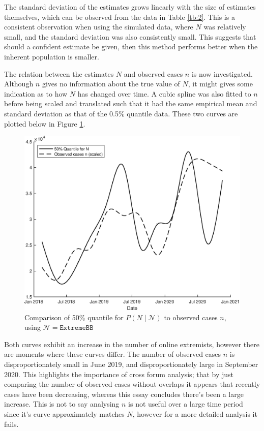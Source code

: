\documentclass[10pt,a4paper,notitlepage]{article}
\begin{document}
The standard deviation of the estimates grows linearly with the size of estimates themselves, which can be observed from the data in Table \ref{tb:2}. This is a consistent observation when using the simulated data, where $N$ was relatively small, and the standard deviation was also consistently small. This suggests that should a confident estimate be given, then this method performs better when the inherent population is smaller.

The relation between the estimates $N$ and observed cases $n$ is now investigated. Although $n$ gives no information about the true value of $N$, it might gives some indication as to how $N$ has changed over time. A cubic spline was also fitted to $n$ before being scaled and translated such that it had the same empirical mean and standard deviation as that of the 0.5\% quantile data. These two curves are plotted below in Figure \ref{fg:2}.

\begin{figure}[H]
\centering
\includegraphics[width=12cm]{Results2}
\caption{Comparison of 50\% quantile for $P(N\mid\mathcal{N})$ to observed cases $n$, using $\mathcal{N}=\texttt{ExtremeBB}$}\label{fg:2}
\end{figure}
Both curves exhibit an increase in the number of online extremists, however there are moments where these curves differ. The number of observed cases $n$ is disproportionately small in June 2019, and disproportionately large in September 2020. This highlights the importance of cross forum analysis; that by just comparing the number of observed cases without overlaps it appears that recently cases have been decreasing, whereas this essay concludes there's been a large increase. This is not to say analysing $n$ is not useful over a large time period since it's curve approximately matches $N$, however for a more detailed analysis it fails.
\end{document}
